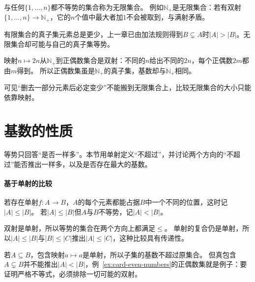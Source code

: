 与任何$\{1,\ldots,n\}$都不等势的集合称为无限集合。
例如$\mathbb N_+$是无限集合：若有双射$\{1,\ldots,n\}\to\mathbb N_+$，它的$n$个值中最大者加$1$不会被取到，与满射矛盾。

有限集合的真子集元素总是更少，上一章已由加法规则得到$B\subsetneq A$时$|A|>|B|$。无限集合却可能与自己的真子集等势。
\begin{example}[正偶数与正整数等势]
\label{ex:card-even-numbers}
映射$n\mapsto2n$从$\mathbb N_+$到正偶数集合是双射：不同的$n$给出不同的$2n$，每个正偶数$2m$都由$m$得到。
所以正偶数集虽是$\mathbb N_+$的真子集，基数却与$\mathbb N_+$相同。
\end{example}
可见“删去一部分元素后必定变少”不能搬到无限集合上，比较无限集合的大小只能依靠映射。

\section{基数的性质}
\label{sec:comb-cardinality-properties}

等势只回答“是否一样多”。本节用单射定义“不超过”，并讨论两个方向的“不超过”能否推出一样多，以及是否存在最大的基数。

\paragraph{基于单射的比较}
若存在单射$f:A\to B$，$A$的每个元素都能占据$B$中一个不同的位置，这时记$|A|\leq|B|$。
若$|A|\leq|B|$但$A$与$B$不等势，记$|A|<|B|$。

双射是单射，所以等势的集合在两个方向上都满足$\leq$。
单射的复合仍是单射，所以$|A|\leq|B|$与$|B|\leq|C|$推出$|A|\leq|C|$，这种比较具有传递性。

若$A\subseteq B$，包含映射$a\mapsto a$是单射，所以子集的基数不超过原集合。
但真包含$A\subsetneq B$并不能推出$|A|<|B|$，例~\ref{ex:card-even-numbers}的正偶数集就是例子：要证明严格不等式，必须排除一切可能的双射。

